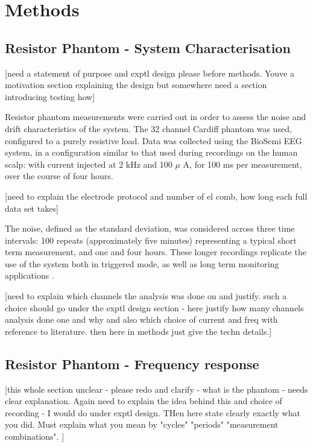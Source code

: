 \section{Methods}


\subsection{Resistor Phantom - System Characterisation}

[need a statement of purpose and exptl design please before methods. Youve a motivation section explaining the design but somewhere need a section introducing testing how]


Resistor phantom measurements were carried out in order to assess the noise and drift characteristics of the system. The 32 channel Cardiff phantom \cite{griffiths1995cole} was used, configured to a purely resistive load.  Data was collected using the BioSemi EEG system, in a configuration similar to that used during recordings on the human scalp: with current injected at 2 kHz and 100 $\mu$ A, for 100 ms per measurement, over the course of four hours.

[need to explain the electrode protocol and number of el comb, how long each full data set takes] 

The noise, defined as the standard deviation, was considered across three time intervals: 100 repeats (approximately five minutes) representing a typical short term measurement, and one and four hours. These longer recordings replicate the use of the system both in triggered mode, as well as long term monitoring applications \cite{fu2014use} \cite{adler2012whither}.

[need to explain which channels the analysis was done on and justify. such a choice should go under the exptl design section - here justify how many channels analysis done one and why and also which choice of current and freq with reference to literature. then here in methods just give the techn details.]

\subsection{Resistor Phantom - Frequency response}

[this whole section unclear - please redo and clarify - what is the phantom - needs clear explanation. Again need to explain the idea behind this and choice of recording - I would do under exptl design. THen here state clearly exactly what you did.  Must explain what you mean by "cycles" "periods" "measurement combinations". ] 

